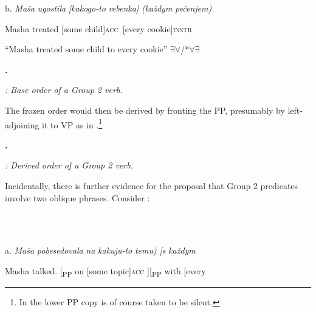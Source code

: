 \documentclass[output=paper,modfonts, nonflat]{langsci/langscibook}
\begin{document}
\begin{styleinnerExample}
\begin{styleinnerExample}
  b.  \textit{Maša}   \textit{ugostila} \textit{[kakogo-to} \textit{rebenka]}  \textit{(každym} \textit{pečenjem)}
\end{styleinnerExample}

\begin{styleinnerExample}
    Masha treated   [some         child]\textsc{acc~}[every    cookie]\textsc{instr}
\end{styleinnerExample}

\begin{styleinnerExample}
    “Masha treated some child to every cookie” ${\exists}{\forall}$/*${\forall}{\exists}$
\end{styleinnerExample}

\textbf{.} 

  
 

\textit{: Base order of a Group 2 verb.}

The frozen order would then be derived by fronting the PP, presumably by left-adjoining it to VP as in .\footnote{In  the lower PP copy is of course taken to be silent.}  

\textbf{.}

  
 

\textit{: Derived order of a Group 2 verb.}

Incidentally, there is further evidence for the proposal that Group 2 predicates involve two oblique phrases. Consider :

\begin{styleinnerExample}
\ea%
    \label{ex:key:53}
    \gll\\
        \\
    \glt
    \z

           a.  \textit{Maša}  \textit{pobesedovala} \textit{na} \textit{kakuju-to} \textit{temu)}             \textit{[s}       \textit{každym}
\end{styleinnerExample}

\begin{styleinnerExample}
    Masha talked.     [\textsubscript{PP}  on [some      topic]\textsc{acc} ][\textsubscript{PP} with [every 
\end{styleinnerExample}


\end{styleinnerExample}
\end{document}
